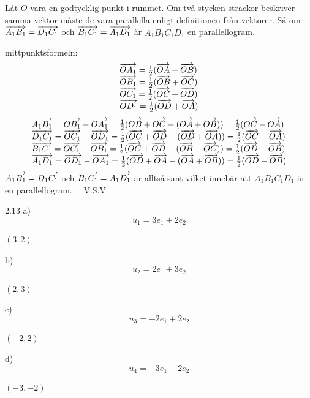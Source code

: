 \begin{task}{2.12}
	Låt $O$ vara en godtycklig punkt i rummet. 
	Om två stycken sträckor beskriver samma vektor måste de vara parallella enligt definitionen från vektorer. 
	Så om $\overrightarrow{A_1B_1}=\overrightarrow{D_1C_1}$ och $\overrightarrow{B_1C_1}=\overrightarrow{A_1D_1}$ är $A_1B_1C_1D_1$ en parallellogram.

	mittpunktsformeln:
	\[\begin{array}{l}
	\overrightarrow{OA_1}=\frac{1}{2}(\overrightarrow{OA}+\overrightarrow{OB}) \\
	\overrightarrow{OB_1}=\frac{1}{2}(\overrightarrow{OB}+\overrightarrow{OC}) \\
	\overrightarrow{OC_1}=\frac{1}{2}(\overrightarrow{OC}+\overrightarrow{OD}) \\
	\overrightarrow{OD_1}=\frac{1}{2}(\overrightarrow{OD}+\overrightarrow{OA})
	\end{array}\]
	\[\begin{array}{l}
	\overrightarrow{A_1B_1}=\overrightarrow{OB_1}-\overrightarrow{OA_1}=\frac{1}{2}(\overrightarrow{OB}+\overrightarrow{OC}-(\overrightarrow{OA}+\overrightarrow{OB}))=\frac{1}{2}(\overrightarrow{OC}-\overrightarrow{OA}) \\
	\overrightarrow{D_1C_1}=\overrightarrow{OC_1}-\overrightarrow{OD_1}=\frac{1}{2}(\overrightarrow{OC}+\overrightarrow{OD}-(\overrightarrow{OD}+\overrightarrow{OA}))=\frac{1}{2}(\overrightarrow{OC}-\overrightarrow{OA}) \\
	\overrightarrow{B_1C_1}=\overrightarrow{OC_1}-\overrightarrow{OB_1}=\frac{1}{2}(\overrightarrow{OC}+\overrightarrow{OD}-(\overrightarrow{OB}+\overrightarrow{OC}))=\frac{1}{2}(\overrightarrow{OD}-\overrightarrow{OB}) \\
	\overrightarrow{A_1D_1}=\overrightarrow{OD_1}-\overrightarrow{OA_1}=\frac{1}{2}(\overrightarrow{OD}+\overrightarrow{OA}-(\overrightarrow{OA}+\overrightarrow{OB}))=\frac{1}{2}(\overrightarrow{OD}-\overrightarrow{OB})
	\end{array}\]
	$\overrightarrow{A_1B_1}=\overrightarrow{D_1C_1}$ och $\overrightarrow{B_1C_1}=\overrightarrow{A_1D_1}$ är alltså sant vilket innebär att $A_1B_1C_1D_1$ är en parallellogram. ~~V.S.V
\end{task}

\pagebreak
\begin{task}{2.13 a)}
	\[u_1=3e_1+2e_2\]
	
	\ans $(3,2)$
\end{task}

\begin{task}{b)}
	\[u_2=2e_1+3e_2\]
	
	\ans $(2,3)$
\end{task}

\begin{task}{c)}
	\[u_3=-2e_1+2e_2\]
	
	\ans $(-2,2)$
\end{task}

\begin{task}{d)}
	\[u_4=-3e_1-2e_2\]
	
	\ans $(-3,-2)$
\end{task}

